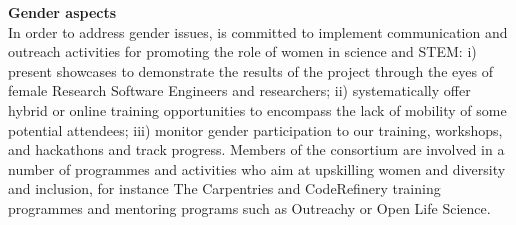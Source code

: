 \medskip
\noindent
\textbf{Gender aspects}\label{sec:gender}\\
In order to address gender issues, \TheProject is committed to implement communication and outreach activities for promoting the role of women in science and STEM: i) present showcases to demonstrate the results of the project through the eyes of female Research Software Engineers and researchers; ii) systematically offer hybrid or online training opportunities to encompass the lack of mobility of some potential attendees; iii) monitor gender participation to our training, workshops, and hackathons and track progress.
Members of the consortium are involved in a number of programmes and activities who aim at upskilling women and diversity and inclusion, for instance The Carpentries and CodeRefinery training programmes and mentoring programs such as Outreachy or Open Life Science.



